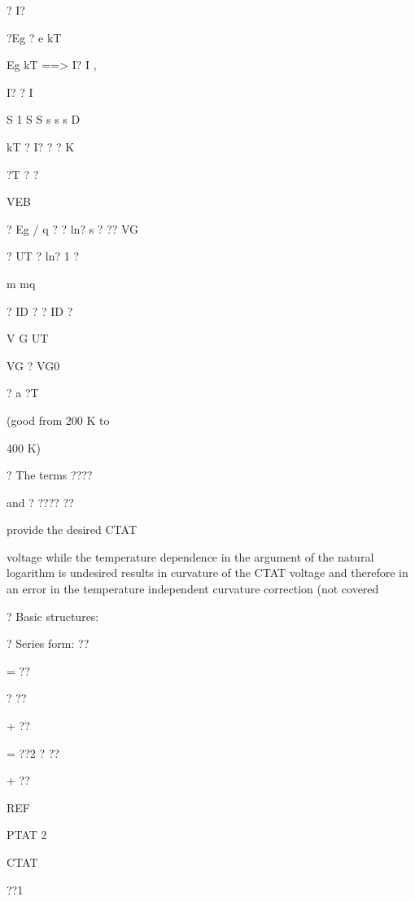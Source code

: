 \documentclass[2pt,landscape]{article}
\begin{document}
\begin{multicols*}{5}
? I?


?Eg
? e kT


Eg \textbullet kT
==>  I? \textbullet I ,


I? ? I


S	1	S	S	s	s	s	D


kT	? I? ?	? K


?T ? ?


VEB


? Eg / q ?	? ln? s ? ?? VG



? UT ? ln?	1	?


m	mq


? ID ?	?	ID	?


V
G	UT



VG ? VG0


?	a ?T


(good from 
200 K to


400 K)





?	The terms ????


and ? ????
??


provide the desired 
CTAT


voltage while the temperature dependence in the 
argument of the natural logarithm is undesired
results in curvature of the CTAT voltage and 
therefore in an error in the \textbullet temperature independent
curvature correction (not covered



?	Basic structures:





















?	Series form: ??


= ??


? ??


+ ??


= ??2 ? ??



+ ??


REF


PTAT	2


CTAT


??1



\end{multicols*}
\end{document}
